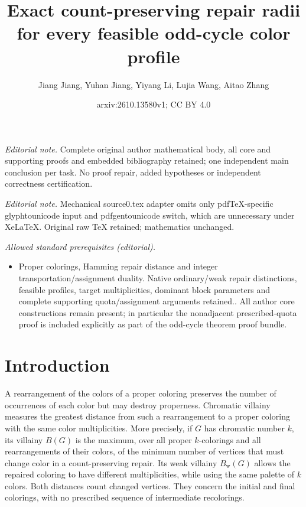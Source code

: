 \documentclass[10pt,a4paper]{amsart}
\title{Exact count-preserving repair radii for every feasible odd-cycle color profile}
\author{Jiang Jiang, Yuhan Jiang, Yiyang Li, Lujia Wang, Aitao Zhang}
\date{arxiv:2610.13580v1; CC BY 4.0}
\numberwithin{equation}{section}
\theoremstyle{definition}
\theoremstyle{remark}
\begin{document}
\maketitle
\noindent\textit{Editorial note.} Complete original author mathematical body, all core and supporting proofs and embedded bibliography retained; one independent main conclusion per task. No proof repair, added hypotheses or independent correctness certification.\par\medskip
\noindent\textit{Editorial note.} Mechanical source0.tex adapter omits only pdfTeX-specific glyphtounicode input and pdfgentounicode switch, which are unnecessary under XeLaTeX. Original raw TeX retained; mathematics unchanged.\par\medskip
\noindent\textit{Allowed standard prerequisites (editorial).}\begin{itemize}
\item Proper colorings, Hamming repair distance and integer transportation/assignment duality. Native ordinary/weak repair distinctions, feasible profiles, target multiplicities, dominant block parameters and complete supporting quota/assignment arguments retained.. All author core constructions remain present; in particular the nonadjacent prescribed-quota proof is included explicitly as part of the odd-cycle theorem proof bundle.
\end{itemize}\medskip
\section{Introduction}

A rearrangement of the colors of a proper coloring preserves the number
of occurrences of each color but may destroy properness. Chromatic
villainy measures the greatest distance from such a rearrangement to a
proper coloring with the same color multiplicities. More precisely, if
$G$ has chromatic number $k$, its villainy $B(G)$ is the maximum, over
all proper $k$-colorings and all rearrangements of their colors, of the
minimum number of vertices that must change color in a count-preserving
repair. Its weak villainy $B_{\mathrm w}(G)$ allows the repaired
coloring to have different multiplicities, while using the same palette
of $k$ colors. Both distances count changed vertices. They concern the
initial and final colorings, with no prescribed sequence of intermediate
recolorings.
\end{document}
